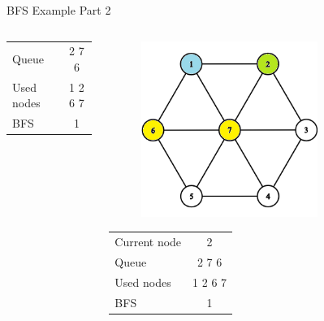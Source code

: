 \documentclass[aspectratio=169]{beamer}%
\begin{document}
\begin{frame}{BFS Example Part 2}
\begin{columns}
\begin{column}{0.32\textwidth}
\begin{table}[ht]
\begin{tabular}{l c}
                    Queue & 2 7 6 \\ 
                    Used nodes & 1 2 6 7\\
                    BFS & 1
                \end{tabular}
            \end{table}
        \end{column}
        \hfill
        \begin{column}{0.32\textwidth}
            \begin{figure}[!ht]
                \centering
                \includegraphics[width=0.9\linewidth]{bfs 5.png}
            \end{figure}
            \begin{table}[ht]
                \centering
                \begin{tabular}{l c}
                    Current node & 2\\
                    Queue & 2 7 6 \\ 
                    Used nodes & 1 2 6 7\\
                    BFS & 1
                \end{tabular}
            \end{table}
        \end{column}
        \hfill
        \begin{column}{0.32\textwidth}
            \begin{figure}[!ht]

\end{figure}
\end{column}
\end{columns}
\end{frame}
\end{document}
